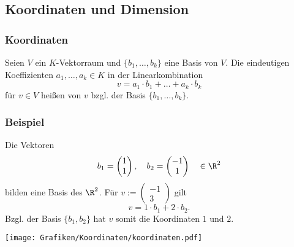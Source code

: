 \subsection{Koordinaten und Dimension}
%
\begin{frame}\frametitle{Koordinaten}

	Seien $V$ ein $K$-Vektorraum und $\{b_1,\ldots, b_k\}$ eine Basis von $V$.
	Die eindeutigen Koeffizienten $a_1,\ldots, a_k\in K$ in der Linearkombination
	$$
		v = a_1\cdot b_1 + \ldots + a_k\cdot b_k
	$$
	für $v\in V$ hei{\ss}en  von $v$ bzgl. der Basis $\{b_1,\ldots, b_k\}$.
	
\end{frame}
%
%
\begin{frame}\frametitle{Beispiel}
	
	\vspace{1mm}
	Die Vektoren
	$$
		b_1 = \begin{pmatrix}
				1\\
				1
			\end{pmatrix},
		\quad
		b_2 = \begin{pmatrix}
				-1\\
				1
			\end{pmatrix}
		\quad
		\in \R^2
	$$
	bilden eine Basis des $\R^2$. \pause
	Für 
	$
		v := 
		\begin{pmatrix}
			-1\\
			3
		\end{pmatrix}
	$
	gilt
	$$
		v = 
		1\cdot b_1 + 2\cdot b_2.
	$$
	\pause
	Bzgl. der Basis $\{b_1, b_2\}$ hat $v$ somit die Koordinaten $1$ und $2$.\\[3mm]
	
	\begin{center}
		\texttt{[image: Grafiken/Koordinaten/koordinaten.pdf]}
	\end{center}
	
	
\end{frame}
%
